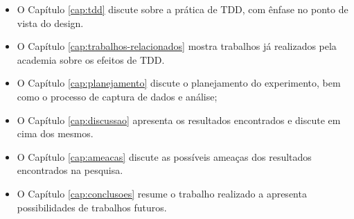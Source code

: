 \begin{itemize}
	\item O Capítulo \ref{cap:tdd} discute sobre a prática de TDD, com ênfase no
	ponto de vista do design.
  
	\item O Capítulo \ref{cap:trabalhos-relacionados} mostra trabalhos já
	realizados pela academia sobre os efeitos de TDD.

	\item O Capítulo \ref{cap:planejamento} discute o planejamento do experimento,
	bem como o processo de captura de dados e análise;

	\item O Capítulo \ref{cap:discussao} apresenta os resultados encontrados e
	discute em cima dos mesmos.
	
	\item O Capítulo \ref{cap:ameacas} discute as possíveis ameaças dos resultados
	encontrados na pesquisa.
	
	\item O Capítulo \ref{cap:conclusoes} resume o trabalho realizado a apresenta
	possibilidades de trabalhos futuros.
\end{itemize}

